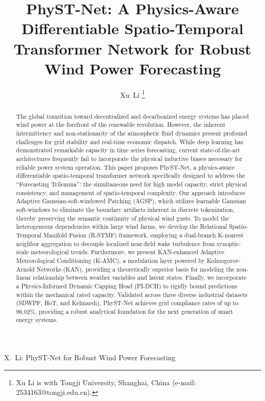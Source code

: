 \documentclass[lettersize,journal]{IEEEtran}
\begin{document}
\title{PhyST-Net: A Physics-Aware Differentiable Spatio-Temporal Transformer Network for Robust Wind Power Forecasting}

\author{Xu~Li
\thanks{Xu Li is with Tongji University, Shanghai, China (e-mail: 2534163@tongji.edu.cn).}%
}

%
{X.~Li: PhyST-Net for Robust Wind Power Forecasting}

\maketitle

\begin{abstract}
The global transition toward decentralized and decarbonized energy systems has placed wind power at the forefront of the renewable revolution. However, the inherent intermittency and non-stationarity of the atmospheric fluid dynamics present profound challenges for grid stability and real-time economic dispatch. While deep learning has demonstrated remarkable capacity in time series forecasting, current state-of-the-art architectures frequently fail to incorporate the physical inductive biases necessary for reliable power system operation. This paper proposes PhyST-Net, a physics-aware differentiable spatio-temporal transformer network specifically designed to address the ``Forecasting Trilemma'': the simultaneous need for high model capacity, strict physical consistency, and management of spatio-temporal complexity. Our approach introduces Adaptive Gaussian-soft-windowed Patching (AGSP), which utilizes learnable Gaussian soft-windows to eliminate the boundary artifacts inherent in discrete tokenization, thereby preserving the semantic continuity of physical wind gusts. To model the heterogeneous dependencies within large wind farms, we develop the Relational Spatio-Temporal Manifold Fusion (R-STMF) framework, employing a dual-branch K-nearest neighbor aggregation to decouple localized near-field wake turbulence from synoptic-scale meteorological trends. Furthermore, we present KAN-enhanced Adaptive Meteorological Conditioning (K-AMC), a modulation layer powered by Kolmogorov-Arnold Networks (KAN), providing a theoretically superior basis for modeling the non-linear relationship between weather variables and latent states. Finally, we incorporate a Physics-Informed Dynamic Capping Head (PI-DCH) to rigidly bound predictions within the mechanical rated capacity. Validated across three diverse industrial datasets (SDWPF, HoT, and Kelmarsh), PhyST-Net achieves grid compliance rates of up to 96.02\%, providing a robust analytical foundation for the next generation of smart energy systems.
\end{abstract}
\end{document}
